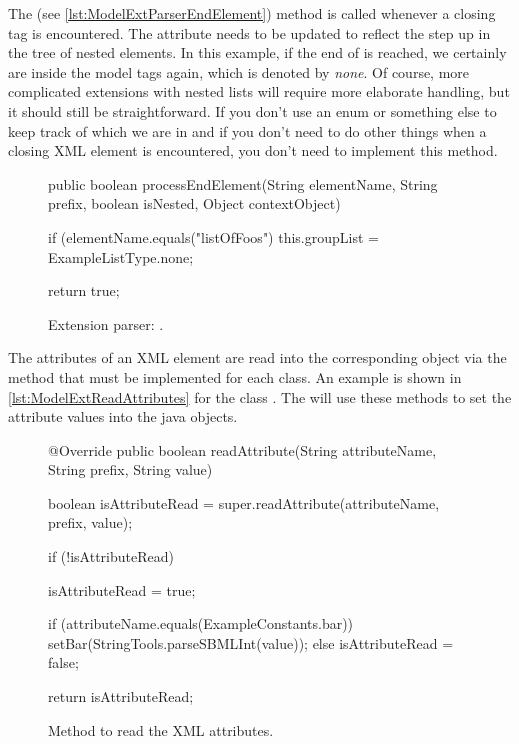 The  (see \vref{lst:ModelExtParserEndElement}) 
method is called whenever a closing tag is
encountered.  The  attribute needs to be updated to reflect the step
up in the tree of nested elements.  In this example, if the end of
 is reached, we certainly are inside the model tags
again, which is denoted by \emph{none}.  Of course, more complicated
extensions with nested lists will require more elaborate handling, but it
should still be straightforward. If you don't use an enum or something else to
keep track of which  we are in and if you don't need to do other
things when a closing XML element is encountered, you don't need to implement this method.

\begin{figure}[htb]
  \begin{example}[numbers=left]
public boolean processEndElement(String elementName, String prefix,
  boolean isNested, Object contextObject) {

  if (elementName.equals("listOfFoos") {
    this.groupList = ExampleListType.none;
  }

  return true;
}\end{example}
  \caption{Extension parser: .}
  \label{lst:ModelExtParserEndElement}
\end{figure}

The attributes of an XML element are read into the corresponding object via the
 method that must be implemented for each class.  An
example is shown in \vref{lst:ModelExtReadAttributes} for the class
. The  will use these methods to set the 
attribute values into the java objects.

\begin{figure}[htb]
  \begin{example}[numbers=left]
@Override
public boolean readAttribute(String attributeName, String prefix, String value) {

  boolean isAttributeRead = super.readAttribute(attributeName, prefix, value);

  if (!isAttributeRead) {
    isAttributeRead = true;

    if (attributeName.equals(ExampleConstants.bar)) {
      setBar(StringTools.parseSBMLInt(value));
    } else {
      isAttributeRead = false;
    }
  }

  return isAttributeRead;
}\end{example}
  \caption{Method to read the XML attributes.}
  \label{lst:ModelExtReadAttributes}
\end{figure}


